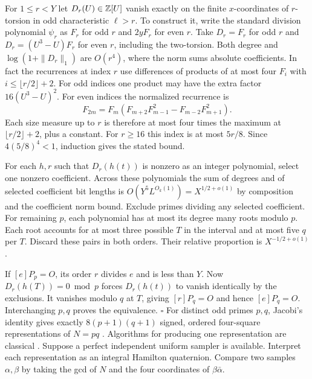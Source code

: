 For $1\le r<Y$ let $D_r(U)\in\mathbb Z[U]$ vanish exactly on the finite $x$-coordinates of $r$-torsion in odd characteristic $\ell>r$. To construct it, write the standard division polynomial $\psi_r$  as $F_r$ for odd $r$ and $2yF_r$ for even $r$. Take $D_r=F_r$ for odd $r$ and $D_r=(U^3-U)F_r$ for even $r$, including the two-torsion. Both degree and $\log(1+\|D_r\|_1)$ are $O(r^4)$, where the norm sums absolute coefficients. In fact the recurrences at index $r$ use differences of products of at most four $F_i$ with $i\le\lfloor r/2\rfloor+2$. For odd indices one product may have the extra factor $16(U^3-U)^2$. For even indices the normalized recurrence is
\[
 F_{2m}=F_m(F_{m+2}F_{m-1}^2-F_{m-2}F_{m+1}^2).
\]
Each size measure up to $r$ is therefore at most four times the maximum at $\lfloor r/2\rfloor+2$, plus a constant. For $r\ge16$ this index is at most $5r/8$. Since $4(5/8)^4<1$, induction gives the stated bound.

For each $h,r$ such that $D_r(h(t))$ is nonzero as an integer polynomial, select one nonzero coefficient. Across these polynomials the sum of degrees and of selected coefficient bit lengths is $O(Y^5 L^{O_k(1)})=X^{1/2+o(1)}$ by composition and the coefficient norm bound. Exclude primes dividing any selected coefficient. For remaining $p$, each polynomial has at most its degree many roots modulo $p$. Each root accounts for at most three possible $T$ in the interval and at most five $q$ per $T$. Discard these pairs in both orders. Their relative proportion is $X^{-1/2+o(1)}$.

If $[e]P_p=O$, its order $r$ divides $e$ and is less than $Y$. Now $D_r(h(T))=0\bmod p$ forces $D_r(h(t))$ to vanish identically by the exclusions. It vanishes modulo $q$ at $T$, giving $[r]P_q=O$ and hence $[e]P_q=O$. Interchanging $p,q$ proves the equivalence. \hfill$\square$
\newpage
{}
For distinct odd primes $p,q$, Jacobi's identity gives exactly $8(p+1)(q+1)$ signed, ordered four-square representations of $N=pq$ . Algorithms for producing one representation are classical . Suppose a perfect independent uniform sampler is available. Interpret each representation as an integral Hamilton quaternion. Compare two samples $\alpha,\beta$ by taking the gcd of $N$ and the four coordinates of $\beta\bar\alpha$.

